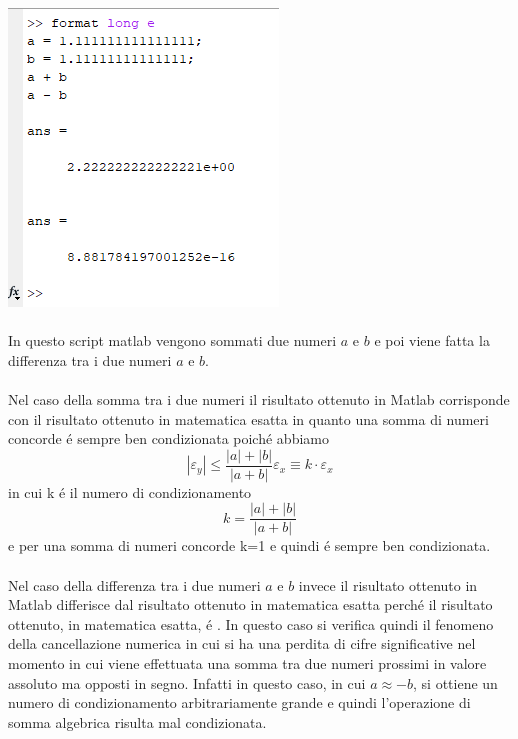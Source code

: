 \includegraphics[width=.65\linewidth]{img/ex4}\\~\\
In questo script matlab vengono sommati due numeri $a$ e $b$ e poi viene fatta la differenza tra i due numeri $a$ e $b$.\\~\\
Nel caso della somma tra i due numeri il risultato ottenuto in Matlab corrisponde con il risultato ottenuto in matematica esatta in quanto una somma di numeri concorde \'e sempre ben condizionata poich\'e abbiamo
\begin{equation}
	\left | \varepsilon_{y}  \right | \leq \frac{\left | a \right | + \left | b \right |}{\left | a + b \right |} \varepsilon_{x} \equiv k \cdot \varepsilon_{x}
\end{equation}
in cui k \'e il numero di condizionamento
\begin{equation}
k =  \frac{\left | a \right | + \left | b \right |}{\left | a + b \right |}
\end{equation}
e per una somma di numeri concorde k=1 e quindi \'e sempre ben condizionata.
\\~\\
Nel caso della differenza tra i due numeri $a$ e $b$ invece il risultato ottenuto in Matlab differisce dal risultato ottenuto in matematica esatta perch\'e il risultato ottenuto, in matematica esatta, \'e  . In questo caso si verifica quindi il fenomeno della cancellazione numerica in cui si ha una perdita di cifre significative nel momento in cui viene effettuata una somma tra due numeri prossimi in valore assoluto ma opposti in segno. Infatti in questo caso, in cui $a \approx -b$, si ottiene un numero di condizionamento arbitrariamente grande e quindi l'operazione di somma algebrica risulta mal condizionata.
